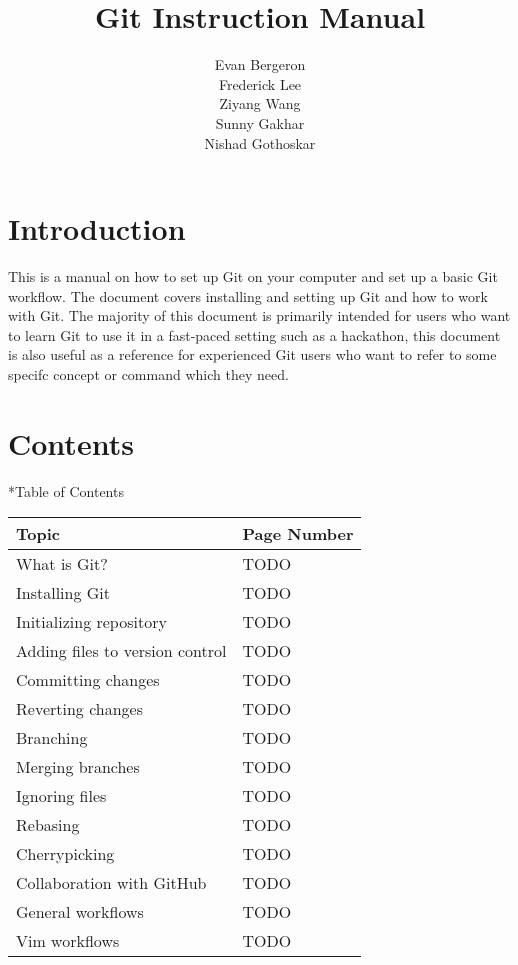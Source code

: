 \documentclass{amsart}
\title{Git Instruction Manual}
\author{Evan Bergeron\\
Frederick Lee\\
Ziyang Wang\\
Sunny Gakhar\\
Nishad Gothoskar}
\makeatletter
\renewcommand\subsection{\@startsection{subsection}{2}%
  \z@{-.5\linespacing\@plus-.7\linespacing}{.5\linespacing}%
  {\normalfont\scshape}}
\makeatother
\begin{document}
\maketitle

\section*{Introduction}

This is a manual on how to set up Git on your computer and set up a basic Git workflow. The document covers installing and setting up Git and how to work with Git. The majority of this document is primarily intended for users who want to learn Git to use it in a fast-paced setting such as a hackathon, this document is also useful as a reference for experienced Git users who want to refer to some specifc concept or command which they need.

\newpage

\section*{Contents}


\subsection*{Table of Contents}
\begin{center}
	\begin{tabular}{ll}
		Topic & Page Number\\
		\hline
		What is Git? & TODO\\
		Installing Git & TODO \\
		Initializing repository & TODO\\
		Adding files to version control & TODO\\
		Committing changes & TODO\\
		Reverting changes & TODO\\
		Branching & TODO\\
		Merging branches & TODO\\
		Ignoring files & TODO\\
		Rebasing & TODO\\
		Cherrypicking & TODO\\
		Collaboration with GitHub & TODO\\
		General workflows & TODO\\
		Vim workflows & TODO\\

	\end{tabular}
\end{center}
\end{document}

